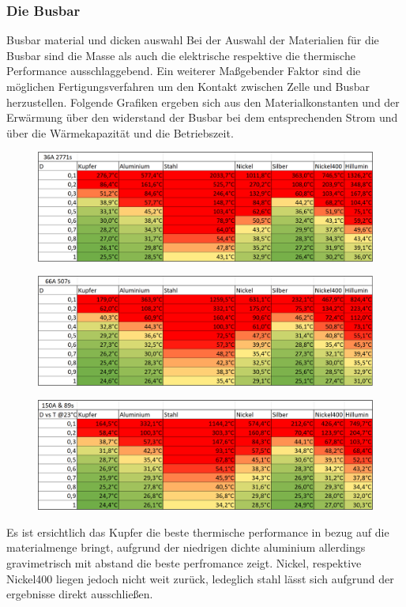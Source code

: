 \FloatBarrier

\subsubsection{Die Busbar}
Busbar material und dicken auswahl
 Bei der Auswahl der Materialien für die Busbar sind die Masse als auch die elektrische respektive die thermische Performance ausschlaggebend. Ein weiterer Maßgebender Faktor sind die möglichen Fertigungsverfahren um den Kontakt zwischen Zelle und Busbar herzustellen. Folgende Grafiken ergeben sich aus den Materialkonstanten und der Erwärmung über den widerstand der Busbar bei dem entsprechenden Strom und über die Wärmekapazität und die Betriebszeit.
 
 \begin{figure}[]
 	\centering
 	\includegraphics[width=0.7\linewidth]{bilder/Busbar_temp_36A_2771s}
 	\caption{}
 	\label{fig:Busbar_temp_36A_2771s}
 \end{figure}
\begin{figure}[]
	\centering
	\includegraphics[width=0.7\linewidth]{bilder/Busbar_temp_66A_507s}
	\caption{}
	\label{fig:Busbar_temp_66A_507s}
\end{figure}
\begin{figure}[]
	\centering
	\includegraphics[width=0.7\linewidth]{bilder/Busbar_temp_150A_89s}
	\caption{}
	\label{fig:Busbar_temp_150A_89s}
\end{figure}

Es ist ersichtlich das Kupfer die beste thermische performance in bezug auf die materialmenge bringt, aufgrund der niedrigen dichte aluminium allerdings gravimetrisch mit abstand die beste perfromance zeigt. Nickel, respektive Nickel400 liegen jedoch nicht weit zurück, ledeglich stahl lässt sich aufgrund der ergebnisse direkt ausschließen.

